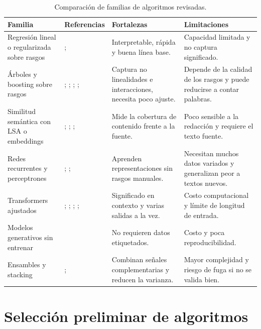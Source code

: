 \documentclass[11pt,a4paper]{article}
\begin{document}
\begin{table}[ht]
\centering
\footnotesize
\caption{Comparación de familias de algoritmos revisadas.}
\label{tab:comparacion}
\begin{tabular}{P{2.7cm}P{3.3cm}P{3.3cm}P{3.3cm}}
\toprule
Familia & Referencias & Fortalezas & Limitaciones \\
\midrule
Regresión lineal o regularizada sobre rasgos &
\citet{attali2006}; \citet{hoerl1970} &
Interpretable, rápida y buena línea base. &
Capacidad limitada y no captura significado. \\
\addlinespace
Árboles y boosting sobre rasgos &
\citet{breiman2001}; \citet{friedman2001}; \citet{chen2016}; \citet{ke2017}; \citet{shwartz2022} &
Captura no linealidades e interacciones, necesita poco ajuste. &
Depende de la calidad de los rasgos y puede reducirse a contar palabras. \\
\addlinespace
Similitud semántica con LSA o embeddings &
\citet{landauer1998}; \citet{kintsch2000}; \citet{reimers2019}; \citet{bojanowski2017} &
Mide la cobertura de contenido frente a la fuente. &
Poco sensible a la redacción y requiere el texto fuente. \\
\addlinespace
Redes recurrentes y perceptrones &
\citet{taghipour2016}; \citet{hochreiter1997}; \citet{kumar2020} &
Aprenden representaciones sin rasgos manuales. &
Necesitan muchos datos variados y generalizan peor a textos nuevos. \\
\addlinespace
Transformers ajustados &
\citet{devlin2019}; \citet{he2021}; \citet{he2023}; \citet{xue2021}; \citet{ludwig2021} &
Significado en contexto y varias salidas a la vez. &
Costo computacional y límite de longitud de entrada. \\
\addlinespace
Modelos generativos sin entrenar &
\citet{mizumoto2023} &
No requieren datos etiquetados. &
Costo y poca reproducibilidad. \\
\addlinespace
Ensambles y stacking &
\citet{wolpert1992}; \citet{shwartz2022} &
Combinan señales complementarias y reducen la varianza. &
Mayor complejidad y riesgo de fuga si no se valida bien. \\
\bottomrule
\end{tabular}
\end{table}

\section{Selección preliminar de algoritmos}
\end{document}

